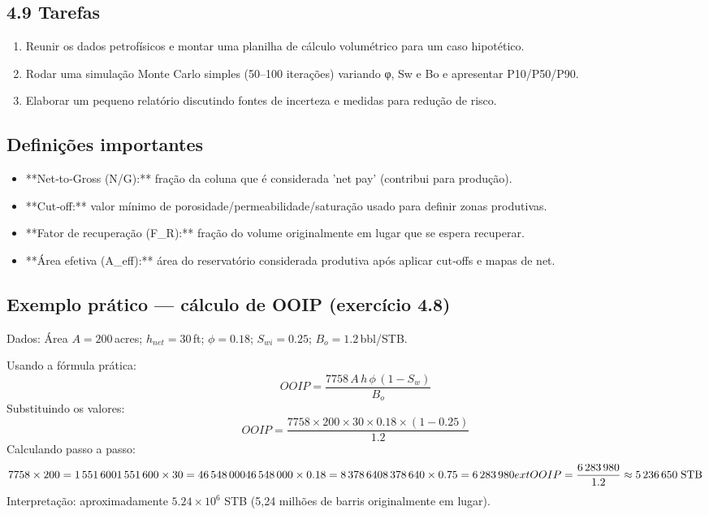 \documentclass[11pt,a4paper]{article}
\begin{document}
\subsection{4.9 Tarefas}
\begin{enumerate}
\item Reunir os dados petrofísicos e montar uma planilha de cálculo volumétrico para um caso hipotético.
\item Rodar uma simulação Monte Carlo simples (50–100 iterações) variando φ, Sw e Bo e apresentar P10/P50/P90.
\item Elaborar um pequeno relatório discutindo fontes de incerteza e medidas para redução de risco.
\end{enumerate}

\subsection{Definições importantes}
\begin{itemize}
\item **Net‑to‑Gross (N/G):** fração da coluna que é considerada 'net pay' (contribui para produção).
\item **Cut‑off:** valor mínimo de porosidade/permeabilidade/saturação usado para definir zonas produtivas.
\item **Fator de recuperação (F_R):** fração do volume originalmente em lugar que se espera recuperar.
\item **Área efetiva (A_eff):** área do reservatório considerada produtiva após aplicar cut‑offs e mapas de net.
\end{itemize}

\subsection{Exemplo prático — cálculo de OOIP (exercício 4.8)}
Dados: Área $A=200\,$acres; $h_{net}=30\,$ft; $\phi=0.18$; $S_{wi}=0.25$; $B_o=1.2\,$bbl/STB.

Usando a fórmula prática:
$$
OOIP = \frac{7758\,A\,h\,\phi\,(1-S_w)}{B_o}
$$
Substituindo os valores:
$$
OOIP = \frac{7758 \times 200 \times 30 \times 0.18 \times (1-0.25)}{1.2}
$$
Calculando passo a passo:
$$
7758\times200 = 1\,551\,600\\
1\,551\,600\times30 = 46\,548\,000\\
46\,548\,000\times0.18 = 8\,378\,640\\
8\,378\,640\times0.75 = 6\,283\,980\\
	ext{OOIP} = \dfrac{6\,283\,980}{1.2} \approx 5\,236\,650\;\text{STB}
$$
Interpretação: aproximadamente $5.24\times10^6$ STB (5,24 milhões de barris originalmente em lugar).
\end{document}
